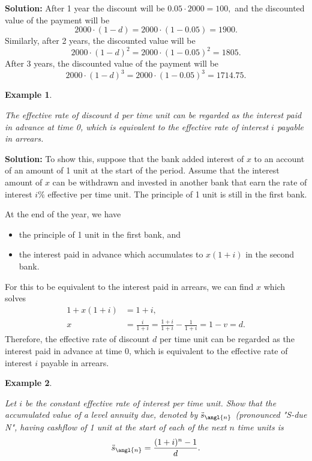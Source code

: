 \documentclass[landscape, 20pt]{extreport}
\theoremstyle{definition}
\theoremstyle{definition}
\newtheorem{example}{Example}[chapter]
\theoremstyle{definition}
\theoremstyle{definition}
\theoremstyle{remark}
\begin{document}
\textbf{Solution:} After 1 year the discount will be \(0.05 \cdot 2000 = 100,\)
and the discounted value of the payment will be
\[2000 \cdot (1 - d) = 2000 \cdot (1 - 0.05) = 1900 .\] Similarly, after
2 years, the discounted value will be
\[2000 \cdot (1 - d)^2 = 2000 \cdot (1 - 0.05)^2 = 1805 .\] After 3
years, the discounted value of the payment will be
\[2000 \cdot (1 - d)^3 = 2000 \cdot (1 - 0.05)^3 = 1714.75 .\]

\newpage \begin{example}
\protect\hypertarget{exm:unlabeled-div-22}{}\label{exm:unlabeled-div-22}

\emph{The effective rate of discount \(d\) per time unit can
be regarded as the interest paid in advance at time 0, which is
equivalent to the effective rate of interest \(i\) payable in arrears.}

\end{example}

\textbf{Solution:} To show this, suppose that the bank added interest of \(x\)
to an account of an amount of 1 unit at the start of the period. Assume
that the interest amount of \(x\) can be withdrawn and invested in another
bank that earn the rate of interest \(i\%\) effective per time unit. The
principle of 1 unit is still in the first bank.

At the end of the year, we have

\begin{itemize}
\item
  the principle of 1 unit in the first bank, and
\item
  the interest paid in advance which accumulates to \(x(1+i)\) in the
  second bank.
\end{itemize}

For this to be equivalent to the interest paid in arrears, we can find
\(x\) which solves \[\begin{aligned}
     1 + x(1+i) &= 1 + i,\\
     x &= \frac{i}{1+i} = \frac{1+i}{1+i} - \frac{1}{1+i}  = 1-v = d.\end{aligned}\]
Therefore, the effective rate of discount \(d\) per time unit can be
regarded as the interest paid in advance at time 0, which is equivalent
to the effective rate of interest \(i\) payable in arrears.

\newpage \begin{example}
\protect\hypertarget{exm:unlabeled-div-23}{}\label{exm:unlabeled-div-23}

\emph{Let \(i\) be the constant effective rate of interest
per time unit. Show that the accumulated value of a level annuity due,
denoted by \(\ddot{s}_\angl{n}\) (pronounced "S-due N", having cashflow
of 1 unit at the start of each of the next \(n\) time units is
\[\ddot{s}_\angl{n} = \frac{(1+i)^n -1 }{d}.\]}

\end{example}
\end{document}
